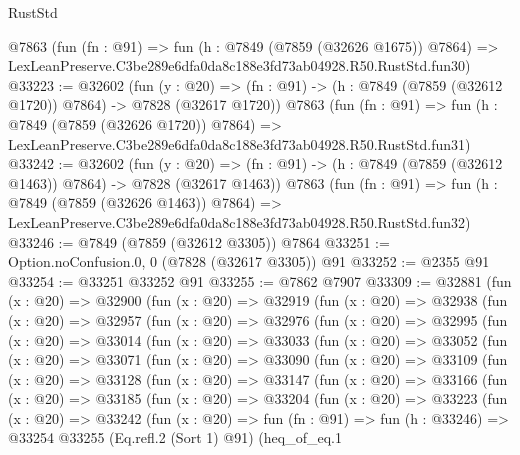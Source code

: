 \begin{lexlean}{RustStd}
\begin{coremodule}
    @7863
    (fun (fn : @91) =>
    fun (h : @7849 (@7859 (@32626 @1675)) @7864) =>
    LexLeanPreserve.C3be289e6dfa0da8c188e3fd73ab04928.R50.RustStd.fun30)
@33223 := @32602
    (fun (y : @20) =>
    (fn : @91) -> (h : @7849 (@7859 (@32612 @1720)) @7864) -> @7828 (@32617 @1720))
    @7863
    (fun (fn : @91) =>
    fun (h : @7849 (@7859 (@32626 @1720)) @7864) =>
    LexLeanPreserve.C3be289e6dfa0da8c188e3fd73ab04928.R50.RustStd.fun31)
@33242 := @32602
    (fun (y : @20) =>
    (fn : @91) -> (h : @7849 (@7859 (@32612 @1463)) @7864) -> @7828 (@32617 @1463))
    @7863
    (fun (fn : @91) =>
    fun (h : @7849 (@7859 (@32626 @1463)) @7864) =>
    LexLeanPreserve.C3be289e6dfa0da8c188e3fd73ab04928.R50.RustStd.fun32)
@33246 := @7849 (@7859 (@32612 @3305)) @7864
@33251 := Option.noConfusion.{0, 0} (@7828 (@32617 @3305)) @91
@33252 := @2355 @91
@33254 := @33251 @33252 @91
@33255 := @7862 @7907
@33309 := @32881
    (fun (x : @20) =>
    @32900
      (fun (x : @20) =>
      @32919
        (fun (x : @20) =>
        @32938
          (fun (x : @20) =>
          @32957
            (fun (x : @20) =>
            @32976
              (fun (x : @20) =>
              @32995
                (fun (x : @20) =>
                @33014
                  (fun (x : @20) =>
                  @33033
                    (fun (x : @20) =>
                    @33052
                      (fun (x : @20) =>
                      @33071
                        (fun (x : @20) =>
                        @33090
                          (fun (x : @20) =>
                          @33109
                            (fun (x : @20) =>
                            @33128
                              (fun (x : @20) =>
                              @33147
                                (fun (x : @20) =>
                                @33166
                                  (fun (x : @20) =>
                                  @33185
                                    (fun (x : @20) =>
                                    @33204
                                      (fun (x : @20) =>
                                      @33223
                                        (fun (x : @20) =>
                                        @33242
                                          (fun (x : @20) =>
                                          fun (fn : @91) =>
                                          fun (h : @33246) =>
                                          @33254
                                            @33255
                                            (Eq.refl.{2} (Sort 1) @91)
                                            (heq_of_eq.{1}

\end{coremodule}
\end{lexlean}
